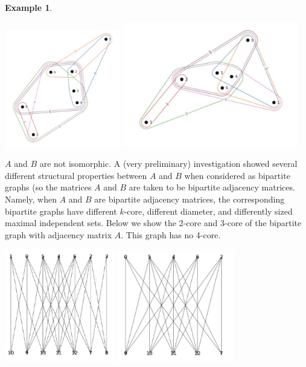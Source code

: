 \documentclass[11pt]{article}
\theoremstyle{definition}
\newtheorem{example}{Example}
\theoremstyle{remark}
\begin{document}
\begin{example}
\begin{center}
\includegraphics[width=2in]{./images/7by7ex_A}
\includegraphics[width=3in]{./images/7by7ex_B}
\end{center}


$A$ and $B$ are not isomorphic. A (very preliminary) investigation showed several different structural properties between $A$ and $B$ when considered as bipartite graphs (so the matrices $A$ and $B$ are taken to be bipartite adjacency matrices. Namely, when $A$ and $B$ are bipartite adjacency matrices, the corresponding bipartite graphs have different $k$-core, different diameter, and differently sized maximal independent sets. Below we show the 2-core and 3-core of the bipartite graph with adjacency matrix $A$. This graph has no 4-core.
\begin{center}
\includegraphics[width=1.9in]{./images/2coreA}
\includegraphics[width=2in]{./images/3coreA}
\end{center}


\end{example}
\end{document}
